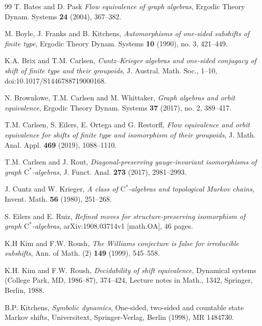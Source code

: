 \documentclass[12pt,a4paper,oneside,reqno,final]{amsart}
\theoremstyle{definition}
\numberwithin{equation}{section} %
\begin{document}
\begin{thebibliography}{99}
     T. Bates and D. Pask
        \emph{Flow equivalence of graph algebras},
        Ergodic Theory Dynam. Systems \textbf{24} (2004), 367--382.

     M. Boyle, J. Franks and B. Kitchens,
        \emph{Automorphisms of one-sided subshifts of finite type},
        Ergodic Theory Dynam. Systems \textbf{10} (1990), no. 3, 421--449.

     K.A. Brix and T.M. Carlsen,
        \emph{Cuntz--Krieger algebras and one-sided conjugacy of shift of finite type and their groupoids},
        J. Austral. Math. Soc., 1--10, doi:10.1017/S1446788719000168.

     N. Brownlowe, T.M. Carlsen and M. Whittaker,
        \emph{Graph algebras and orbit equivalence},
        Ergodic Theory Dynam. Systems \textbf{37} (2017), no. 2, 389--417.

     T.M. Carlsen, S. Eilers, E. Ortega and G. Restorff,
        \emph{Flow equivalence and orbit equivalence for shifts of finite type and isomorphism of their groupoids},
        J. Math. Anal. Appl. \textbf{469} (2019), 1088--1110.

     T.M. Carlsen and J. Rout,
        \emph{Diagonal-preserving gauge-invariant isomorphisms of graph $\mathrm C^*$-algebras},
        J. Funct. Anal. \textbf{273} (2017), 2981--2993.

     J. Cuntz and W. Krieger,
        \emph{A class of {$\mathrm C^{\ast} $}-algebras and topological {M}arkov chains}, 
        Invent. Math. \textbf{56} (1980), 251--268.

     S. Eilers and E. Ruiz,
        \emph{Refined moves for structure-preserving isomorphism of graph $\mathrm C^*$-algebras},
        arXiv:1908.03714v1 [math.OA], 46 pages.

     K.H Kim and F.W. Roush,
        \emph{The Williams conjecture is false for irreducible subshifts},
        Ann. of Math. (2) \textbf{149} (1999), 545--558.

     K.H. Kim and F.W. Roush,
        \emph{Decidability of shift equivalence},
        Dynamical systems (College Park, MD, 1986--87), 374--424, Lecture notes in Math., 1342, Springer, Berlin, 1988.

     B.P. Kitchens,
        \emph{Symbolic dynamics}, One-sided, two-sided and countable state Markov shifts,
        Universitext, Springer-Verlag, Berlin (1998), MR 1484730.


\end{thebibliography}
\end{document}
